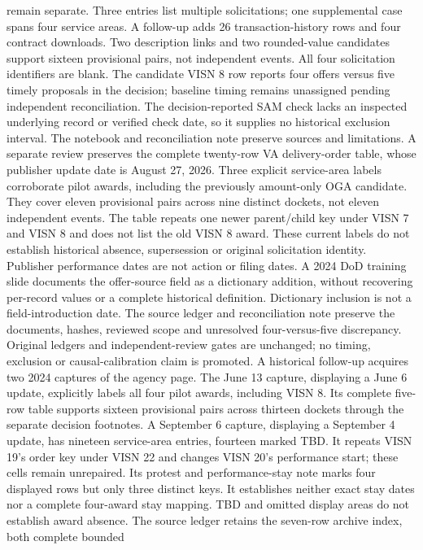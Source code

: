 remain separate. Three entries list multiple solicitations; one supplemental
case spans four service areas. A follow-up adds 26 transaction-history rows and
four contract downloads. Two description links and two rounded-value candidates
support sixteen provisional pairs, not independent events. All four solicitation
identifiers are blank. The candidate VISN 8 row reports four offers versus five
timely proposals in the decision; baseline timing remains unassigned pending
independent reconciliation. The decision-reported SAM check lacks an inspected
underlying record or verified check date, so it supplies no historical exclusion
interval. The notebook and reconciliation note preserve sources and limitations.
A separate review preserves the complete twenty-row VA delivery-order table,
whose publisher update date is August 27, 2026. Three explicit service-area
labels corroborate pilot awards, including the previously amount-only OGA
candidate. They cover eleven provisional pairs across nine distinct dockets,
not eleven independent events. The table repeats one newer parent/child key
under VISN 7 and VISN 8 and does not list the old VISN 8 award. These current
labels do not establish historical absence, supersession or original solicitation
identity. Publisher performance dates are not action or filing dates. A 2024
DoD training slide documents the offer-source field as a dictionary addition,
without recovering per-record values or a complete historical definition.
Dictionary inclusion is not a field-introduction date. The source ledger and
reconciliation note preserve the documents, hashes, reviewed scope and unresolved
four-versus-five discrepancy. Original ledgers and independent-review gates are
unchanged; no timing, exclusion or causal-calibration claim is promoted.
A historical follow-up acquires two 2024 captures of the agency page. The June
13 capture, displaying a June 6 update, explicitly labels all four pilot awards,
including VISN 8. Its complete five-row table supports sixteen provisional
pairs across thirteen dockets through the separate decision footnotes. A
September 6 capture, displaying a September 4 update, has nineteen service-area
entries, fourteen marked TBD. It repeats VISN 19's order key under VISN 22 and
changes VISN 20's performance start; these cells remain unrepaired. Its protest
and performance-stay note marks four displayed rows but only three distinct
keys. It establishes neither exact stay dates nor a complete four-award stay
mapping. TBD and omitted display areas do not establish award absence. The
source ledger retains the seven-row archive index, both complete bounded
